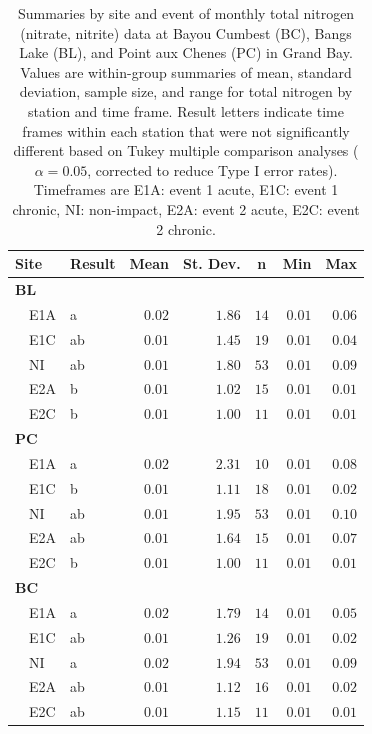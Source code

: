 \documentclass[letterpaper,12pt]{article}\usepackage[]{graphicx}\usepackage[]{color}
\begin{document}
\begin{table}[!tbp]
\caption{Summaries by site and event of monthly total nitrogen (nitrate, nitrite) data at Bayou Cumbest (BC), Bangs Lake (BL), and Point aux Chenes (PC) in Grand Bay.  Values are within-group summaries of mean, standard deviation, sample size, and range for total nitrogen by station and time frame.  Result letters indicate time frames within each station that were not significantly different based on Tukey multiple comparison analyses ($\alpha = 0.05$, corrected to reduce Type I error rates). Timeframes are E1A: event 1 acute, E1C: event 1 chronic, NI: non-impact, E2A: event 2 acute, E2C: event 2 chronic.\label{tab:tntab}} 
\begin{center}
\begin{tabular}{llrrrrr}
\hline\hline
\multicolumn{1}{l}{Site}&\multicolumn{1}{c}{Result}&\multicolumn{1}{c}{Mean}&\multicolumn{1}{c}{St. Dev.}&\multicolumn{1}{c}{n}&\multicolumn{1}{c}{Min}&\multicolumn{1}{c}{Max}\tabularnewline
\hline
{\bfseries BL}&&&&&&\tabularnewline
~~E1A&a&$0.02$&$1.86$&$14$&$0.01$&$0.06$\tabularnewline
~~E1C&ab&$0.01$&$1.45$&$19$&$0.01$&$0.04$\tabularnewline
~~NI&ab&$0.01$&$1.80$&$53$&$0.01$&$0.09$\tabularnewline
~~E2A&b&$0.01$&$1.02$&$15$&$0.01$&$0.01$\tabularnewline
~~E2C&b&$0.01$&$1.00$&$11$&$0.01$&$0.01$\tabularnewline
\hline
{\bfseries PC}&&&&&&\tabularnewline
~~E1A&a&$0.02$&$2.31$&$10$&$0.01$&$0.08$\tabularnewline
~~E1C&b&$0.01$&$1.11$&$18$&$0.01$&$0.02$\tabularnewline
~~NI&ab&$0.01$&$1.95$&$53$&$0.01$&$0.10$\tabularnewline
~~E2A&ab&$0.01$&$1.64$&$15$&$0.01$&$0.07$\tabularnewline
~~E2C&b&$0.01$&$1.00$&$11$&$0.01$&$0.01$\tabularnewline
\hline
{\bfseries BC}&&&&&&\tabularnewline
~~E1A&a&$0.02$&$1.79$&$14$&$0.01$&$0.05$\tabularnewline
~~E1C&ab&$0.01$&$1.26$&$19$&$0.01$&$0.02$\tabularnewline
~~NI&a&$0.02$&$1.94$&$53$&$0.01$&$0.09$\tabularnewline
~~E2A&ab&$0.01$&$1.12$&$16$&$0.01$&$0.02$\tabularnewline
~~E2C&ab&$0.01$&$1.15$&$11$&$0.01$&$0.01$\tabularnewline
\hline
\end{tabular}\end{center}

\end{table}

\clearpage
\end{document}
